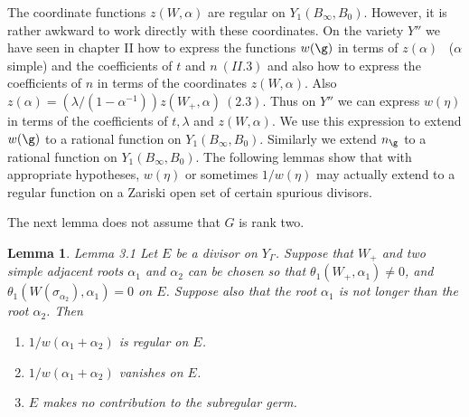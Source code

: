 \documentclass{memo-l}
\newtheorem{lemma}[theorem]{Lemma}
\theoremstyle{definition}
\theoremstyle{remark}
\numberwithin{section}{chapter}
\numberwithin{equation}{chapter}
\begin{document}
   The coordinate functions $z(W,{\alpha})$ are regular on $Y_{1}(B_{{\infty}},
B_{0})$.
 However, it is rather awkward to work directly with these coordinates.
 On the variety $Y''$ we have seen in chapter II how to express the functions
$w({\g})$ in terms of $z({\alpha})$ \ (${\alpha}$ simple) and the coefficients
of $t$ and $n \ (II.3)$ and also how to express the coefficients of $n$ in terms
of the coordinates $z(W,{\alpha})$.
 Also $z({\alpha}) = ({\lambda}/(1-{\alpha}^{-1}))z(W_{+},{\alpha}) \
 (2.3)$.
 Thus on $Y''$ we can express $w({\eta})$ in terms of the coefficients of $t,
{\lambda}$ and $z(W,{\alpha})$.
 We use this expression to extend $w({\g})$ to a rational function on
$Y_{1}(B_{{\infty}},B_{0})$.
 Similarly we extend $n_{{\g}}$ to a rational function on
$Y_{1}(B_{{\infty}},B_{0})$.
 The following lemmas show that with appropriate hypotheses, $w({\eta})$ or
sometimes $1/w({\eta})$ may actually extend to a regular function on a Zariski
open set of certain spurious divisors.

   The next lemma does not assume that $G$ is rank two.

\medpagebreak

\begin{lemma}{Lemma 3.1}   Let $E$ be a divisor on $Y_{{\Gamma}}$.
 Suppose that $W_{+}$ and two simple adjacent roots ${\alpha}_{1}$ and
${\alpha}_{2}$ can be chosen so that ${\theta}_{1}(W_{+},{\alpha}_{1})\ne 0$,
and ${\theta}_{1}(W({\sigma}_{\alpha_2}),{\alpha}_{1}) = 0$ on $E$.
 Suppose also that the root ${\alpha}_{1}$ is not longer than the root
${\alpha}_{2}$.
 Then

\begin{enumerate}[label=\alph*)]
\item $1/w({\alpha}_{1}+{\alpha}_{2})$ is regular on $E$.
\item $1/w({\alpha}_{1}+{\alpha}_{2})$ vanishes on $E$.
\item $E$ makes no contribution to the subregular germ.
\end{enumerate}
\end{lemma}

\medpagebreak
\end{document}
